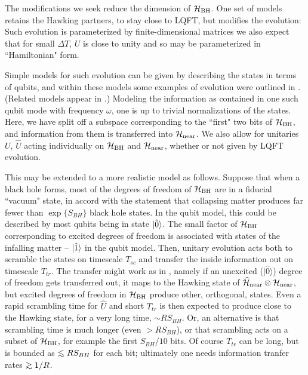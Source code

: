 
The modifications we seek reduce the dimension of ${{\cal H}_{\rm BH}}$.  One set of models retains the Hawking partners, to stay close to LQFT, but modifies the evolution:
%
\eqn{}
%
Such evolution is parameterized by finite-dimensional matrices
%
\eqn{}
%
we also expect that for small $\Delta T$, $U$ is close to unity and so may be parameterized in ``Hamiltonian" form.

Simple models for such evolution can be given by describing the states in terms of qubits, and within these models some examples of evolution were outlined in \ModelsU.  (Related models appear in .)  Modeling the information as contained in one such qubit mode with frequency $\omega$, one is
%
\eqn{} 
%
up to trivial normalizations of the states. Here, we have split off a subspace corresponding to the ``first" two bits of ${{\cal H}_{\rm BH}}$, and information from them is transferred into ${{\cal H}_{\rm near}}$.  We also allow for unitaries $U$, ${\hat U}$ acting individually on ${{\cal H}_{\rm BH}}$ and ${{\cal H}_{\rm near}}$, whether or not given by LQFT evolution. 

This may be extended to a more realistic model as follows.  Suppose that when a black hole forms, most of the degrees of freedom of ${{\cal H}_{\rm BH}}$ are in a fiducial ``vacuum" state, in accord with the statement that collapsing matter produces far fewer than $\exp\{S_{BH}\}$ black hole states.  In the qubit model, this could be described by most qubits being in state $|{\hat 0}\rangle$.  The small factor of ${{\cal H}_{\rm BH}}$ corresponding to excited degrees of freedom is associated with states of the infalling matter -- $|{\hat 1}\rangle$ in the qubit model.  Then, unitary evolution acts both to scramble the states on  timescale $T_{sc}$ and transfer the inside information out on  timescale $T_{tr}$.  The transfer might work as in \evoltwo, namely if an unexcited ($|{\hat 0}\rangle$) degree of freedom gets transferred out, it maps to the Hawking state of ${\widehat{\cal H}}_{\rm near}\otimes {{\cal H}_{\rm near}}$, but excited degrees of freedom in ${{\cal H}_{\rm BH}}$ produce other, orthogonal, states.  Even a rapid scrambling time for $\hat U$ and short $T_{tr}$ is then expected to produce close to the Hawking state, for a very long time, $\sim R S_{BH}$.  Or, an alternative is that scrambling time is much longer (even $> RS_{BH}$), or that scrambling acts on a subset of ${{\cal H}_{\rm BH}}$, for example the first $S_{BH}/10$ bits.  Of course $T_{tr}$ can be long, but is bounded as $\roughly< R S_{BH}$ for each bit; ultimately one needs information tranfer rates $\roughly> 1/R$.  


